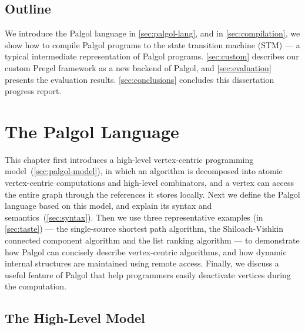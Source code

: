 \documentclass{sokendai_thesis} %
\begin{document}
\section{Outline}

We introduce the Palgol language in \autoref{sec:palgol-lang}, and in \autoref{sec:compilation}, we show how to compile Palgol programs to the state transition machine (STM) --- a typical intermediate representation of Palgol programs.
\autoref{sec:custom} describes our custom Pregel framework as a new backend of Palgol, and \autoref{sec:evaluation} presents the evaluation results.
\autoref{sec:conclusions} concludes this dissertation progress report.

\chapter{The Palgol Language}
\label{sec:palgol-lang}

This chapter first introduces a high-level vertex-centric programming model~(\autoref{sec:palgol-model}), in which an algorithm is decomposed into atomic vertex-centric computations and high-level combinators, and a vertex can access the entire graph through the references it stores locally.
Next we define the Palgol language based on this model, and explain its syntax and semantics~(\autoref{sec:syntax}).
Then we use three representative examples (in \autoref{sec:taste}) --- the single-source shortest path algorithm, the Shiloach-Vishkin connected component algorithm and the list ranking algorithm --- to demonstrate how Palgol can concisely describe vertex-centric algorithms, and how dynamic internal structures are maintained using remote access.
Finally, we discuss a useful feature of Palgol that help programmers easily deactivate vertices during the computation.


\section{The High-Level Model}
\label{sec:palgol-model}
\end{document}
